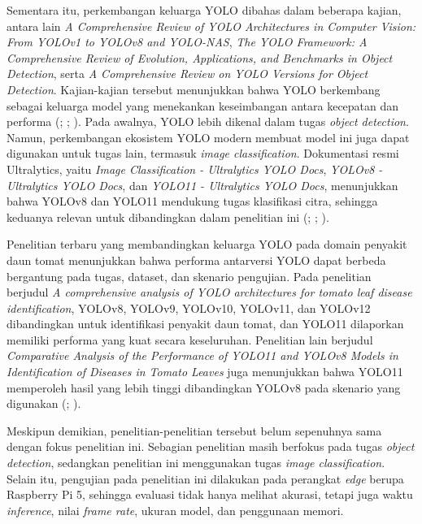\begin{sectioncontent}
    Sementara itu, perkembangan keluarga YOLO dibahas dalam beberapa kajian, antara lain \textit{A Comprehensive Review of YOLO Architectures in Computer Vision: From YOLOv1 to YOLOv8 and YOLO-NAS}, \textit{The YOLO Framework: A Comprehensive Review of Evolution, Applications, and Benchmarks in Object Detection}, serta \textit{A Comprehensive Review on YOLO Versions for Object Detection}. Kajian-kajian tersebut menunjukkan bahwa YOLO berkembang sebagai keluarga model yang menekankan keseimbangan antara kecepatan dan performa (\citealp[hlm. 1680--1683]{terven2023yolo}; \citealp[hlm. 1--3]{ali2024yoloframework}; \citealp[hlm. 1--3]{murat2025yolo}). Pada awalnya, YOLO lebih dikenal dalam tugas \textit{object detection}. Namun, perkembangan ekosistem YOLO modern membuat model ini juga dapat digunakan untuk tugas lain, termasuk \textit{image classification}. Dokumentasi resmi Ultralytics, yaitu \textit{Image Classification - Ultralytics YOLO Docs}, \textit{YOLOv8 - Ultralytics YOLO Docs}, dan \textit{YOLO11 - Ultralytics YOLO Docs}, menunjukkan bahwa YOLOv8 dan YOLO11 mendukung tugas klasifikasi citra, sehingga keduanya relevan untuk dibandingkan dalam penelitian ini (\citealp[bagian \textit{Image Classification}]{ultralyticsclassify}; \citealp[bagian \textit{YOLOv8 Models}]{ultralyticsyolov8}; \citealp[bagian \textit{YOLO11 Models}]{ultralyticsyolo11}).

    Penelitian terbaru yang membandingkan keluarga YOLO pada domain penyakit daun tomat menunjukkan bahwa performa antarversi YOLO dapat berbeda bergantung pada tugas, dataset, dan skenario pengujian. Pada penelitian berjudul \textit{A comprehensive analysis of YOLO architectures for tomato leaf disease identification}, YOLOv8, YOLOv9, YOLOv10, YOLOv11, dan YOLOv12 dibandingkan untuk identifikasi penyakit daun tomat, dan YOLO11 dilaporkan memiliki performa yang kuat secara keseluruhan. Penelitian lain berjudul \textit{Comparative Analysis of the Performance of YOLO11 and YOLOv8 Models in Identification of Diseases in Tomato Leaves} juga menunjukkan bahwa YOLO11 memperoleh hasil yang lebih tinggi dibandingkan YOLOv8 pada skenario yang digunakan (\citealp[hlm. 1--2 dan 7--8]{ramos2025comprehensive}; \citealp[hlm. 63--64]{majid2025comparative}).

    Meskipun demikian, penelitian-penelitian tersebut belum sepenuhnya sama dengan fokus penelitian ini. Sebagian penelitian masih berfokus pada tugas \textit{object detection}, sedangkan penelitian ini menggunakan tugas \textit{image classification}. Selain itu, pengujian pada penelitian ini dilakukan pada perangkat \textit{edge} berupa Raspberry Pi 5, sehingga evaluasi tidak hanya melihat akurasi, tetapi juga waktu \textit{inference}, nilai \textit{frame rate}, ukuran model, dan penggunaan memori.


\end{sectioncontent}
